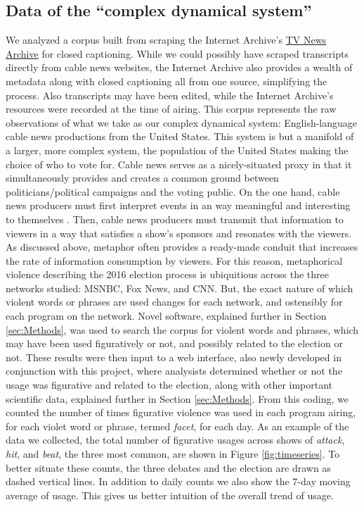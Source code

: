 \subsection{Data of the ``complex dynamical system''}

We analyzed a corpus built from scraping the Internet Archive's 
\href{http://archive.org/tv/details}{TV News Archive} for closed captioning.
While we could possibly have scraped transcripts directly from cable news
websites, the Internet Archive also provides a wealth of metadata along with
closed captioning all from one source, simplifying the process. Also transcripts
may have been edited, while the Internet Archive's resources were recorded
at the time of airing. This corpus represents the raw observations of what we
take as our complex dynamical system: English-language cable news productions
from the United States. This system is but a manifold of a larger, 
more complex system,
the population of the United States making the choice of who to vote for. 
Cable news serves as
a nicely-situated proxy in that it simultaneously provides and creates
a common ground between politicians/political campaigns and the voting public.
On the one hand, cable news producers must first 
interpret events in an way meaningful and interesting to themselves \cite{Clark1996}. 
Then, cable news producers must transmit that information to viewers in a
way that satisfies a show's sponsors and resonates
with the viewers. As discussed above, metaphor often provides
a ready-made conduit that increases the rate of information consumption by
viewers. For this reason, metaphorical violence describing the 2016 election
process is ubiquitious across the three networks studied: MSNBC, Fox News, and
CNN. But, the exact nature of which violent words or phrases are used changes
for each network, and ostensibly for each program on the network. Novel 
software, explained further in Section \ref{sec:Methods}, 
was used to search the corpus for violent words and phrases, which may have been
used figuratively or not, and possibly related to the election or not.
These results were then input to a web interface, also newly developed in 
conjunction with this project, where analysists determined whether or not the
usage was figurative and related to the election, along with other important
scientific data, explained further in Section \ref{sec:Methods}. 
From this coding, we counted the number of times figurative violence was 
used in each program airing, for each violet word or phrase, termed 
\textit{facet}, for each day. As an example of the data we collected, the 
total number of figurative usages across shows of \textit{attack}, \textit{hit}, and
\textit{beat}, the three most common, are shown in Figure \ref{fig:timeseries}. 
To better situate these counts, the three debates and the election are drawn
as dashed vertical lines. In addition to daily counts we also show the 7-day
moving average of usage. This gives us better intuition of the overall trend
of usage.

